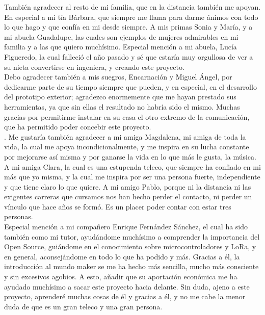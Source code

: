 \documentclass[12pt]{article}
\begin{document}
	\noindent También agradecer al resto de mi familia, que en la distancia también me apoyan. En especial a mi tía Bárbara, que siempre me llama para darme ánimos con todo lo que hago y que confía en mi desde siempre. A mis primas Sonia y María, y a mi abuela Guadalupe, las cuales son ejemplos de mujeres admirables en mi familia y a las que quiero muchísimo. Especial mención a mi abuela, Lucía Figueredo, la cual falleció el año pasado y sé que estaría muy orgullosa de ver a su nieta convertirse en ingeniera, y creando este proyecto. \\
	
	 Debo agradecer también a mis suegros, Encarnación y Miguel Ángel, por dedicarme parte de su tiempo siempre que pueden, y en especial, en el desarrollo del prototipo exterior; agradezco enormemente que me hayan prestado sus herramientas, ya que sin ellas el resultado no habría sido el mismo. Muchas gracias por permitirme instalar en su casa el otro extremo de la comunicación, que ha permitido poder concebir este proyecto. \\
	
	. Me gustaría también agradecer a mi amiga Magdalena, mi amiga de toda la vida, la cual me apoya incondicionalmente, y me inspira en su lucha constante por mejorarse así misma y por ganarse la vida en lo que más le gusta, la música. A mi amiga Clara, la cual es una estupenda teleco, que siempre ha confiado en mi más que yo misma, y la cual me inspira por ser una persona fuerte, independiente y que tiene claro lo que quiere. A mi amigo Pablo, porque ni la distancia ni las exigentes carreras que cursamos nos han hecho perder el contacto, ni perder un vínculo que hace años se formó. Es un placer poder contar con estar tres personas.\\  
	
	\noindent [Enrique] Especial mención a mi compañero Enrique Fernández Sánchez, el cual ha sido también como mi tutor, ayudándome muchísimo a comprender la importancia del Open Source, guiándome en el conocimiento sobre microcontroladores y LoRa, y en general, aconsejándome en todo lo que ha podido y más. Gracias a él, la introducción al mundo maker se me ha hecho más sencilla, mucho más consciente y sin excesivos agobios. A esto, añadir que su aportación económica me ha ayudado muchísimo a sacar este proyecto hacia delante. Sin duda, ajeno a este proyecto, aprenderé muchas cosas de él y gracias a él, y no me cabe la menor duda de que es un gran teleco y una gran persona.\\
	
\end{document}
